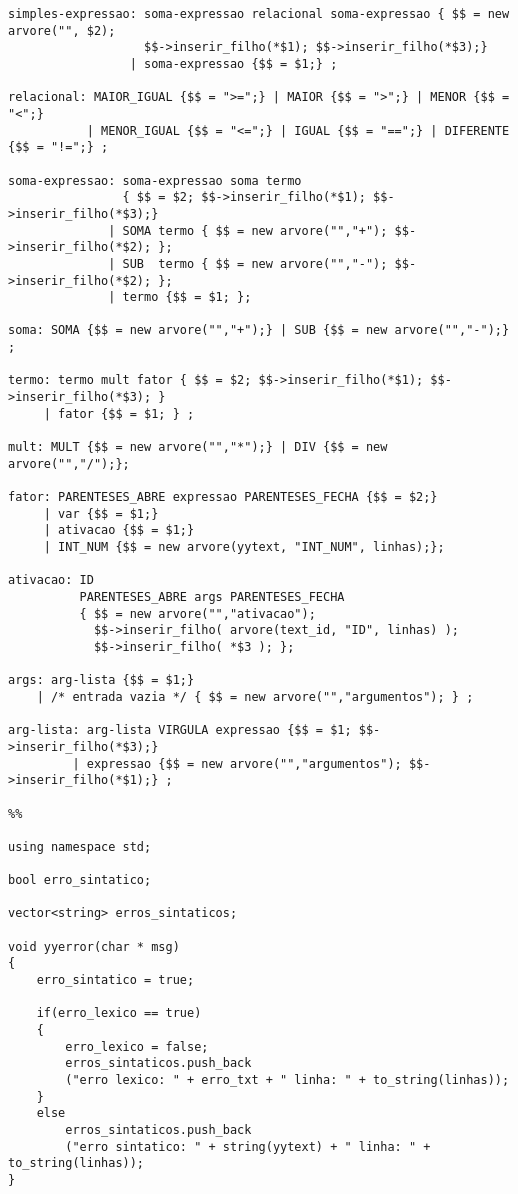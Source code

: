 \begin{lstlisting}
simples-expressao: soma-expressao relacional soma-expressao { $$ = new arvore("", $2);
                   $$->inserir_filho(*$1); $$->inserir_filho(*$3);}
                 | soma-expressao {$$ = $1;} ;

relacional: MAIOR_IGUAL {$$ = ">=";} | MAIOR {$$ = ">";} | MENOR {$$ = "<";} 
           | MENOR_IGUAL {$$ = "<=";} | IGUAL {$$ = "==";} | DIFERENTE {$$ = "!=";} ;

soma-expressao: soma-expressao soma termo 
                { $$ = $2; $$->inserir_filho(*$1); $$->inserir_filho(*$3);}
              | SOMA termo { $$ = new arvore("","+"); $$->inserir_filho(*$2); };
              | SUB  termo { $$ = new arvore("","-"); $$->inserir_filho(*$2); };
              | termo {$$ = $1; };

soma: SOMA {$$ = new arvore("","+");} | SUB {$$ = new arvore("","-");} ;

termo: termo mult fator { $$ = $2; $$->inserir_filho(*$1); $$->inserir_filho(*$3); }
     | fator {$$ = $1; } ;

mult: MULT {$$ = new arvore("","*");} | DIV {$$ = new arvore("","/");};

fator: PARENTESES_ABRE expressao PARENTESES_FECHA {$$ = $2;}
     | var {$$ = $1;}
     | ativacao {$$ = $1;}
     | INT_NUM {$$ = new arvore(yytext, "INT_NUM", linhas);};

ativacao: ID
          PARENTESES_ABRE args PARENTESES_FECHA
          { $$ = new arvore("","ativacao");
            $$->inserir_filho( arvore(text_id, "ID", linhas) );
            $$->inserir_filho( *$3 ); };

args: arg-lista {$$ = $1;}
    | /* entrada vazia */ { $$ = new arvore("","argumentos"); } ;

arg-lista: arg-lista VIRGULA expressao {$$ = $1; $$->inserir_filho(*$3);}
         | expressao {$$ = new arvore("","argumentos"); $$->inserir_filho(*$1);} ;

%%

using namespace std;

bool erro_sintatico;

vector<string> erros_sintaticos;

void yyerror(char * msg)
{
	erro_sintatico = true;

	if(erro_lexico == true)
	{
		erro_lexico = false;
		erros_sintaticos.push_back
		("erro lexico: " + erro_txt + " linha: " + to_string(linhas));
	}
	else
		erros_sintaticos.push_back
		("erro sintatico: " + string(yytext) + " linha: " + to_string(linhas));
}

\end{lstlisting}

